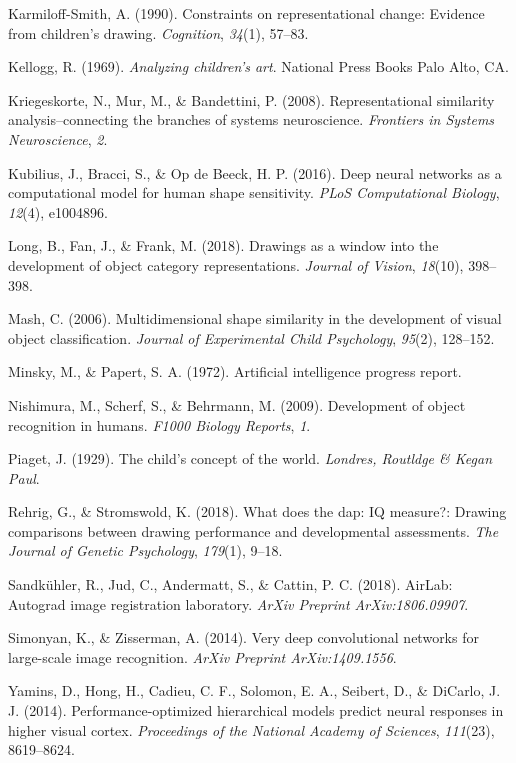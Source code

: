 \documentclass[10pt, letterpaper]{article}
\begin{document}
\hypertarget{ref-karmiloff1990constraints}{}
Karmiloff-Smith, A. (1990). Constraints on representational change:
Evidence from children's drawing. \emph{Cognition}, \emph{34}(1),
57--83.

\hypertarget{ref-kellogg1969analyzing}{}
Kellogg, R. (1969). \emph{Analyzing children's art}. National Press
Books Palo Alto, CA.

\hypertarget{ref-kriegeskorte2008RSA}{}
Kriegeskorte, N., Mur, M., \& Bandettini, P. (2008). Representational
similarity analysis--connecting the branches of systems neuroscience.
\emph{Frontiers in Systems Neuroscience}, \emph{2}.

\hypertarget{ref-kubilius2016deep}{}
Kubilius, J., Bracci, S., \& Op de Beeck, H. P. (2016). Deep neural
networks as a computational model for human shape sensitivity.
\emph{PLoS Computational Biology}, \emph{12}(4), e1004896.

\hypertarget{ref-long2018drawings}{}
Long, B., Fan, J., \& Frank, M. (2018). Drawings as a window into the
development of object category representations. \emph{Journal of
Vision}, \emph{18}(10), 398--398.

\hypertarget{ref-mash2006}{}
Mash, C. (2006). Multidimensional shape similarity in the development of
visual object classification. \emph{Journal of Experimental Child
Psychology}, \emph{95}(2), 128--152.

\hypertarget{ref-minsky1972artificial}{}
Minsky, M., \& Papert, S. A. (1972). Artificial intelligence progress
report.

\hypertarget{ref-nishimura2009}{}
Nishimura, M., Scherf, S., \& Behrmann, M. (2009). Development of object
recognition in humans. \emph{F1000 Biology Reports}, \emph{1}.

\hypertarget{ref-piaget1929child}{}
Piaget, J. (1929). The child's concept of the world. \emph{Londres,
Routldge \& Kegan Paul}.

\hypertarget{ref-rehrig2018does}{}
Rehrig, G., \& Stromswold, K. (2018). What does the dap: IQ measure?:
Drawing comparisons between drawing performance and developmental
assessments. \emph{The Journal of Genetic Psychology}, \emph{179}(1),
9--18.

\hypertarget{ref-sandkuhler2018}{}
Sandkühler, R., Jud, C., Andermatt, S., \& Cattin, P. C. (2018). AirLab:
Autograd image registration laboratory. \emph{ArXiv Preprint
ArXiv:1806.09907}.

\hypertarget{ref-simonyan2014very}{}
Simonyan, K., \& Zisserman, A. (2014). Very deep convolutional networks
for large-scale image recognition. \emph{ArXiv Preprint
ArXiv:1409.1556}.

\hypertarget{ref-yamins2014performance}{}
Yamins, D., Hong, H., Cadieu, C. F., Solomon, E. A., Seibert, D., \&
DiCarlo, J. J. (2014). Performance-optimized hierarchical models predict
neural responses in higher visual cortex. \emph{Proceedings of the
National Academy of Sciences}, \emph{111}(23), 8619--8624.


\end{document}
